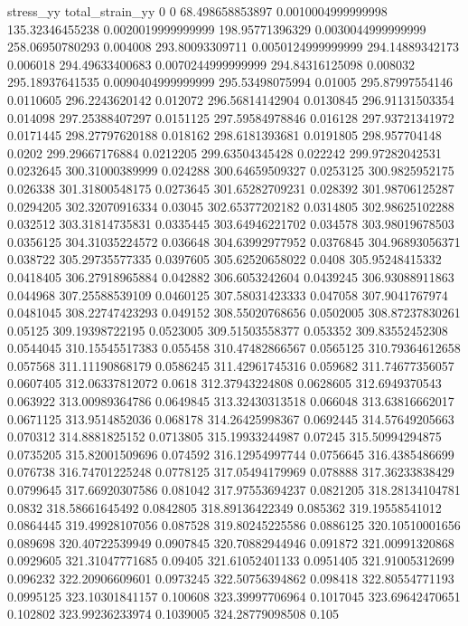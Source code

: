 stress_yy total_strain_yy
0 0
68.498658853897 0.0010004999999998
135.32346455238 0.0020019999999999
198.95771396329 0.0030044999999999
258.06950780293 0.004008
293.80093309711 0.0050124999999999
294.14889342173 0.006018
294.49633400683 0.0070244999999999
294.84316125098 0.008032
295.18937641535 0.0090404999999999
295.53498075994 0.01005
295.87997554146 0.0110605
296.2243620142 0.012072
296.56814142904 0.0130845
296.91131503354 0.014098
297.25388407297 0.0151125
297.59584978846 0.016128
297.93721341972 0.0171445
298.27797620188 0.018162
298.6181393681 0.0191805
298.957704148 0.0202
299.29667176884 0.0212205
299.63504345428 0.022242
299.97282042531 0.0232645
300.31000389999 0.024288
300.64659509327 0.0253125
300.9825952175 0.026338
301.31800548175 0.0273645
301.65282709231 0.028392
301.98706125287 0.0294205
302.32070916334 0.03045
302.65377202182 0.0314805
302.98625102288 0.032512
303.31814735831 0.0335445
303.64946221702 0.034578
303.98019678503 0.0356125
304.31035224572 0.036648
304.63992977952 0.0376845
304.96893056371 0.038722
305.29735577335 0.0397605
305.62520658022 0.0408
305.95248415332 0.0418405
306.27918965884 0.042882
306.6053242604 0.0439245
306.93088911863 0.044968
307.25588539109 0.0460125
307.58031423333 0.047058
307.9041767974 0.0481045
308.22747423293 0.049152
308.55020768656 0.0502005
308.87237830261 0.05125
309.19398722195 0.0523005
309.51503558377 0.053352
309.83552452308 0.0544045
310.15545517383 0.055458
310.47482866567 0.0565125
310.79364612658 0.057568
311.11190868179 0.0586245
311.42961745316 0.059682
311.74677356057 0.0607405
312.06337812072 0.0618
312.37943224808 0.0628605
312.6949370543 0.063922
313.00989364786 0.0649845
313.32430313518 0.066048
313.63816662017 0.0671125
313.9514852036 0.068178
314.26425998367 0.0692445
314.57649205663 0.070312
314.8881825152 0.0713805
315.19933244987 0.07245
315.50994294875 0.0735205
315.82001509696 0.074592
316.12954997744 0.0756645
316.4385486699 0.076738
316.74701225248 0.0778125
317.05494179969 0.078888
317.36233838429 0.0799645
317.66920307586 0.081042
317.97553694237 0.0821205
318.28134104781 0.0832
318.58661645492 0.0842805
318.89136422349 0.085362
319.19558541012 0.0864445
319.49928107056 0.087528
319.80245225586 0.0886125
320.10510001656 0.089698
320.40722539949 0.0907845
320.70882944946 0.091872
321.00991320868 0.0929605
321.31047771685 0.09405
321.61052401133 0.0951405
321.91005312699 0.096232
322.20906609601 0.0973245
322.50756394862 0.098418
322.80554771193 0.0995125
323.10301841157 0.100608
323.39997706964 0.1017045
323.69642470651 0.102802
323.99236233974 0.1039005
324.28779098508 0.105
